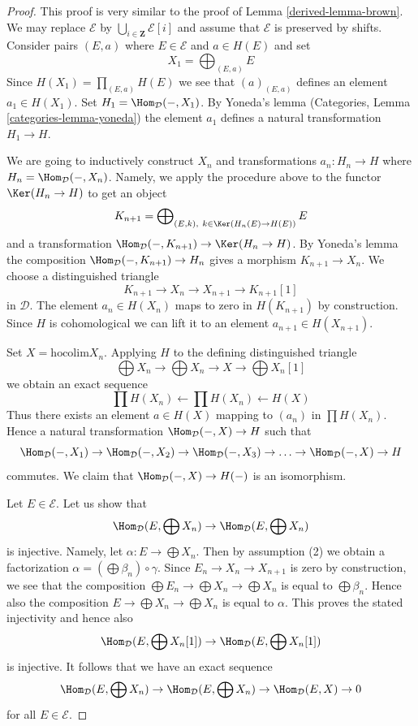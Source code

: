 \begin{proof}

This proof is very similar to the proof of Lemma \ref{derived-lemma-brown}.
We may replace $\mathcal{E}$ by
$\bigcup_{i \in \mathbf{Z}} \mathcal{E}[i]$ and assume
that $\mathcal{E}$ is preserved by shifts.
Consider pairs $(E, a)$ where $E \in \mathcal{E}$ and $a \in H(E)$ and set
$$
X_1 = \bigoplus\nolimits_{(E, a)} E
$$
Since $H(X_1) = \prod_{(E, a)} H(E)$ we see that $(a)_{(E, a)}$
defines an element $a_1 \in H(X_1)$. Set $H_1 = \Hom_\mathcal{D}(- , X_1)$.
By Yoneda's lemma (Categories, Lemma \ref{categories-lemma-yoneda})
the element $a_1$ defines a natural transformation $H_1 \to H$.

\medskip\noindent
We are going to inductively construct $X_n$ and transformations
$a_n : H_n \to H$ where $H_n = \Hom_\mathcal{D}(-, X_n)$.
Namely, we apply the procedure
above to the functor $\Ker(H_n \to H)$ to get an object
$$
K_{n + 1} = \bigoplus\nolimits_{(E, k),\ k \in \Ker(H_n(E) \to H(E))} E
$$
and a transformation $\Hom_\mathcal{D}(-, K_{n + 1}) \to \Ker(H_n \to H)$.
By Yoneda's lemma the composition $\Hom_\mathcal{D}(-, K_{n + 1}) \to H_n$
gives a morphism $K_{n + 1} \to X_n$. We choose
a distinguished triangle
$$
K_{n + 1} \to X_n \to X_{n + 1} \to K_{n + 1}[1]
$$
in $\mathcal{D}$. The element $a_n \in H(X_n)$ maps to zero
in $H(K_{n + 1})$ by construction. Since $H$ is cohomological
we can lift it to an element $a_{n + 1} \in H(X_{n + 1})$.

\medskip\noindent
Set $X = \text{hocolim} X_n$. Applying $H$
to the defining distinguished triangle
$$
\bigoplus X_n \to
\bigoplus X_n \to X \to
\bigoplus X_n[1]
$$
we obtain an exact sequence
$$
\prod H(X_n) \leftarrow
\prod H(X_n) \leftarrow
H(X)
$$
Thus there exists an element $a \in H(X)$ mapping to $(a_n)$
in $\prod H(X_n)$. Hence a natural transformation
$\Hom_\mathcal{D}(- , X) \to H$ such that
$$
\Hom_\mathcal{D}(-, X_1) \to
\Hom_\mathcal{D}(-, X_2) \to
\Hom_\mathcal{D}(-, X_3) \to \ldots \to
\Hom_\mathcal{D}(-, X) \to H
$$
commutes. We claim that $\Hom_\mathcal{D}(-, X) \to H(-)$ is an isomorphism.

\medskip\noindent
Let $E \in \mathcal{E}$. Let us show that
$$
\Hom_\mathcal{D}(E, \bigoplus X_n) \to  \Hom_\mathcal{D}(E, \bigoplus X_n)
$$
is injective. Namely, let $\alpha : E \to \bigoplus X_n$. Then
by assumption (2) we obtain a factorization
$\alpha = (\bigoplus \beta_n) \circ \gamma$.
Since $E_n \to X_n \to X_{n + 1}$ is zero by construction, we see that
the composition $\bigoplus E_n \to \bigoplus X_n \to \bigoplus X_n$
is equal to $\bigoplus \beta_n$. Hence also the composition
$E \to \bigoplus X_n \to \bigoplus X_n$ is equal to $\alpha$.
This proves the stated injectivity and hence also
$$
\Hom_\mathcal{D}(E, \bigoplus X_n[1]) \to \Hom_\mathcal{D}(E, \bigoplus X_n[1])
$$
is injective. It follows that we have an exact sequence
$$
\Hom_\mathcal{D}(E, \bigoplus X_n) \to
\Hom_\mathcal{D}(E, \bigoplus X_n) \to
\Hom_\mathcal{D}(E, X) \to 0
$$
for all $E \in \mathcal{E}$.


\end{proof}
